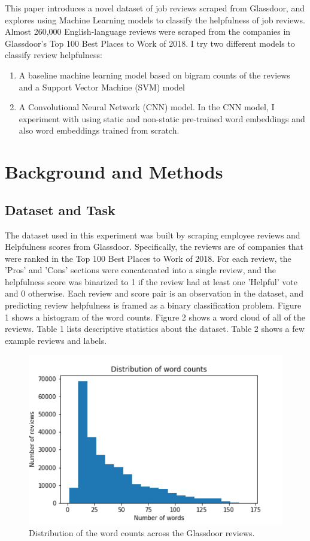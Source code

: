 \documentclass[11pt,a4paper]{article}
\begin{document}
	This paper introduces a novel dataset of job reviews scraped from Glassdoor, and explores using Machine Learning models to classify the helpfulness of job reviews. Almost 260,000 English-language reviews were scraped from the companies in Glassdoor's Top 100 Best Places to Work of 2018. I try two different models to classify review helpfulness:
	
	\begin{enumerate}
		\item A baseline machine learning model based on bigram counts of the reviews and a Support Vector Machine (SVM) model
		\item  A Convolutional Neural Network (CNN) model. In the CNN model, I experiment with using static and non-static pre-trained word embeddings and also word embeddings trained from scratch.
	\end{enumerate}
	
	\section{Background and Methods}
	
	\subsection{Dataset and Task}
	The dataset used in this experiment was built by scraping employee reviews and Helpfulness scores from Glassdoor. Specifically, the reviews are of companies that were ranked in the Top 100 Best Places to Work of 2018. For each review, the 'Pros' and 'Cons' sections were concatenated into a single review, and the helpfulness score was binarized to 1 if the review had at least one 'Helpful' vote and 0 otherwise. Each review and score pair is an observation in the dataset, and predicting review helpfulness is framed as a binary classification problem. Figure 1 shows a histogram of the word counts. Figure 2 shows a word cloud of all of the reviews. Table 1 lists descriptive statistics about the dataset. Table 2 shows a few example reviews and labels.
	
	\begin{figure}[h]
		\begin{center}
			\includegraphics[scale=0.5]{wordcounts}
			\caption[scale=0.75]{Distribution of the word counts across the Glassdoor reviews.}
		\end{center}
	\end{figure}
	
\end{document}
